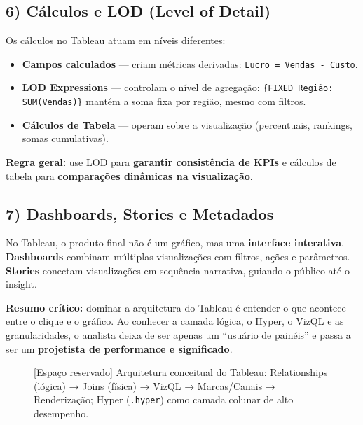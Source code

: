 \subsection*{6) Cálculos e LOD (Level of Detail)}
Os cálculos no Tableau atuam em níveis diferentes:
\begin{itemize}[leftmargin=*]
  \item \textbf{Campos calculados} — criam métricas derivadas: \texttt{Lucro = Vendas - Custo}.
  \item \textbf{LOD Expressions} — controlam o nível de agregação:  
    \texttt{\{FIXED Região: SUM(Vendas)\}} mantém a soma fixa por região, mesmo com filtros.  
  \item \textbf{Cálculos de Tabela} — operam sobre a visualização (percentuais, rankings, somas cumulativas).
\end{itemize}

\begin{FormulaBox}
\textbf{Regra geral:} use LOD para \textbf{garantir consistência de KPIs} e cálculos de tabela para \textbf{comparações dinâmicas na visualização}.
\end{FormulaBox}

\subsection*{7) Dashboards, Stories e Metadados}
No Tableau, o produto final não é um gráfico, mas uma \textbf{interface interativa}.  
\textbf{Dashboards} combinam múltiplas visualizações com filtros, ações e parâmetros.  
\textbf{Stories} conectam visualizações em sequência narrativa, guiando o público até o insight.

\begin{NoteBox}
\textbf{Resumo crítico:} dominar a arquitetura do Tableau é entender o que acontece entre o clique e o gráfico.  
Ao conhecer a camada lógica, o Hyper, o VizQL e as granularidades, o analista deixa de ser apenas um “usuário de painéis” e passa a ser um \textbf{projetista de performance e significado}.
\end{NoteBox}

\begin{figure}[H]
\centering
\fbox{\rule{0pt}{120pt}\rule{0.92\linewidth}{0pt}}
\caption{[Espaço reservado] Arquitetura conceitual do Tableau: Relationships (lógica) → Joins (física) → VizQL → Marcas/Canais → Renderização; Hyper (\texttt{.hyper}) como camada colunar de alto desempenho.}
\end{figure}


